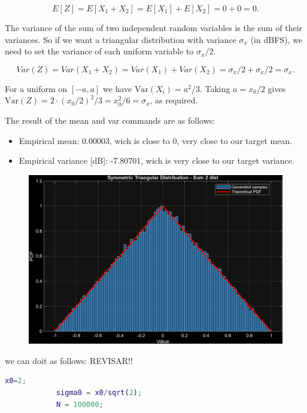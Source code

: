\documentclass[11pt,a4paper]{article}
\begin{document}
\begin{itemize}
          \[
              E[Z] = E[X_1 + X_2] = E[X_1] + E[X_2] = 0 + 0 = 0.
          \]

          The variance of the sum of two independent random variables is the sum of their variances.
          So if we want a triangular distribution with variance $\sigma_x$ (in dBFS), we need to set the variance of each uniform variable to $\sigma_x/2$.

          \[
              Var(Z) = Var(X_1 + X_2) = Var(X_1) + Var(X_2) = \sigma_x/2 + \sigma_x/2 = \sigma_x.
          \]

          For a uniform on \([-a,a]\) we have \(\mathrm{Var}(X_i)=a^{2}/3\). Taking \(a=x_0/2\) gives \(\mathrm{Var}(Z)=2\cdot (x_0/2)^2/3 = x_0^2/6 = \sigma_x\), as required.

          The result of the mean and var commands are as follows:
          \begin{itemize}
              \item Empirical mean: 0.00003, wich is close to 0, very close to our target mean.
              \item Empirical variance [dB]: -7.80701, wich is very close to our target variance.
          \end{itemize}

          \begin{figure}[H]
              \centering
              \includegraphics[width=1\textwidth]{img/task3_tri_sum2uniform.png}
              \label{fig:task3_tri_sum2uniform}
          \end{figure}

          we can doit as follows: REVISAR!!
          \begin{lstlisting}[language=Matlab]
            x0=2;
            sigma0 = x0/sqrt(2);
            N = 100000;
            

\end{lstlisting}
\end{itemize}
\end{document}
